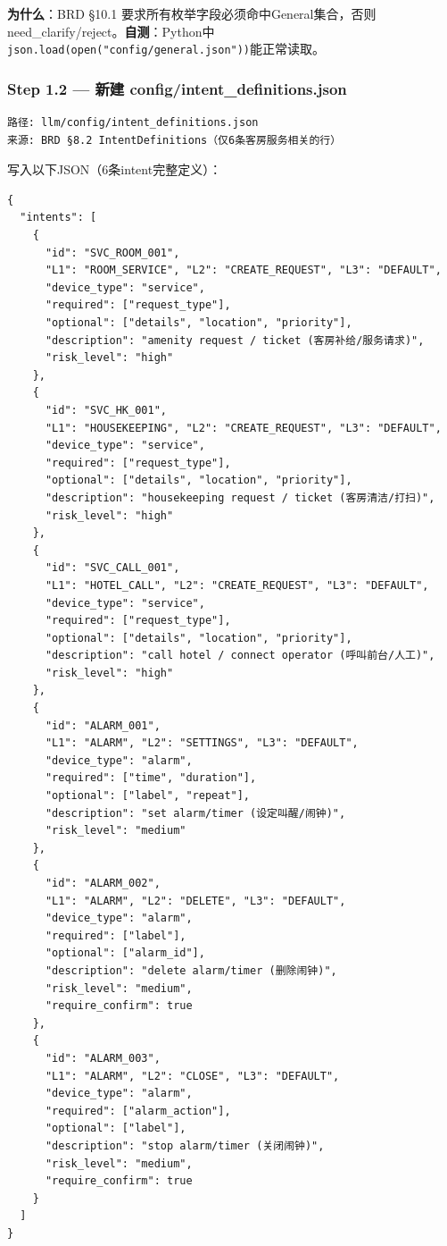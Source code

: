 \documentclass[12pt,a4paper]{ctexart}
\begin{document}
\textbf{为什么}：BRD §10.1 要求所有枚举字段必须命中General集合，否则need\_clarify/reject。\textbf{自测}：Python中\texttt{json.load(open("config/general.json"))}能正常读取。

\subsubsection*{Step 1.2 — 新建 config/intent\_definitions.json}
\begin{verbatim}
路径: llm/config/intent_definitions.json
来源: BRD §8.2 IntentDefinitions（仅6条客房服务相关的行）
\end{verbatim}

写入以下JSON（6条intent完整定义）：

{\small
\begin{verbatim}
{
  "intents": [
    {
      "id": "SVC_ROOM_001",
      "L1": "ROOM_SERVICE", "L2": "CREATE_REQUEST", "L3": "DEFAULT",
      "device_type": "service",
      "required": ["request_type"],
      "optional": ["details", "location", "priority"],
      "description": "amenity request / ticket (客房补给/服务请求)",
      "risk_level": "high"
    },
    {
      "id": "SVC_HK_001",
      "L1": "HOUSEKEEPING", "L2": "CREATE_REQUEST", "L3": "DEFAULT",
      "device_type": "service",
      "required": ["request_type"],
      "optional": ["details", "location", "priority"],
      "description": "housekeeping request / ticket (客房清洁/打扫)",
      "risk_level": "high"
    },
    {
      "id": "SVC_CALL_001",
      "L1": "HOTEL_CALL", "L2": "CREATE_REQUEST", "L3": "DEFAULT",
      "device_type": "service",
      "required": ["request_type"],
      "optional": ["details", "location", "priority"],
      "description": "call hotel / connect operator (呼叫前台/人工)",
      "risk_level": "high"
    },
    {
      "id": "ALARM_001",
      "L1": "ALARM", "L2": "SETTINGS", "L3": "DEFAULT",
      "device_type": "alarm",
      "required": ["time", "duration"],
      "optional": ["label", "repeat"],
      "description": "set alarm/timer (设定叫醒/闹钟)",
      "risk_level": "medium"
    },
    {
      "id": "ALARM_002",
      "L1": "ALARM", "L2": "DELETE", "L3": "DEFAULT",
      "device_type": "alarm",
      "required": ["label"],
      "optional": ["alarm_id"],
      "description": "delete alarm/timer (删除闹钟)",
      "risk_level": "medium",
      "require_confirm": true
    },
    {
      "id": "ALARM_003",
      "L1": "ALARM", "L2": "CLOSE", "L3": "DEFAULT",
      "device_type": "alarm",
      "required": ["alarm_action"],
      "optional": ["label"],
      "description": "stop alarm/timer (关闭闹钟)",
      "risk_level": "medium",
      "require_confirm": true
    }
  ]
}
\end{verbatim}
}
\end{document}
